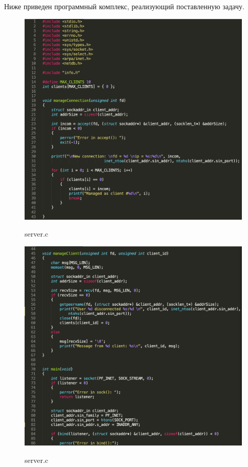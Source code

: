 \documentclass[a4paper,12pt]{article}
\begin{document}
	Ниже приведен программный комплекс, реализующий поставленную задачу.
	
	\begin{figure}[h!]
		\begin{center}
			{\includegraphics[scale = 0.6]{server1_2.png}}
			\label{ris:server1_2}
		\end{center}
		\caption{server.c}
	\end{figure}

	\newpage

	\begin{figure}[h!]
		\begin{center}
			{\includegraphics[scale = 0.6]{server2_2.png}}
			\label{ris:server2_2}
		\end{center}
		\caption{server.c}
	\end{figure}
\end{document}
